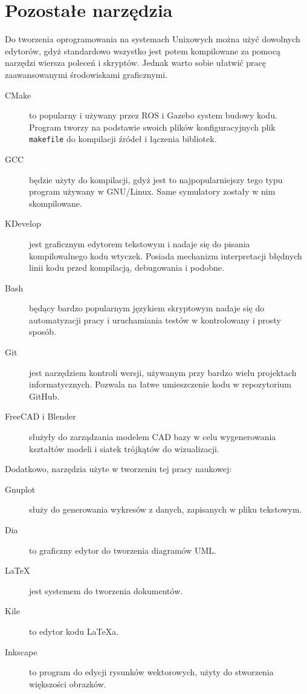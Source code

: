 \section{Pozostałe narzędzia}
	Do tworzenia oprogramowania na systemach Unixowych można użyć dowolnych edytorów, gdyż standardowo wszystko jest potem kompilowane za pomocą narzędzi wiersza poleceń i skryptów.
	Jednak warto sobie ułatwić pracę zaawansowanymi środowiskami graficznymi.
	\begin{description}
	\item[CMake] to popularny i używany przez ROS i Gazebo system budowy kodu. Program tworzy na podstawie swoich plików konfiguracyjnych plik \texttt{makefile} do kompilacji źródeł i łączenia bibliotek.
	\item[GCC] będzie użyty do kompilacji, gdyż jest to najpopularniejszy tego typu program używany w GNU/Linux. Same symulatory zostały w nim skompilowane.
	\item[KDevelop] jest graficznym edytorem tekstowym i nadaje się do pisania kompilowalnego kodu wtyczek.
	Posiada mechanizm interpretacji błędnych linii kodu przed kompilacją, debugowania i podobne.
	\item[Bash] będący bardzo popularnym językiem skryptowym nadaje się do automatyzacji pracy i uruchamiania testów w kontrolowany i prosty sposób.
	\item[Git] jest narzędziem kontroli wersji, używanym przy bardzo wielu projektach informatycznych. Pozwala na łatwe umieszczenie kodu w repozytorium GitHub.
	\item[FreeCAD i Blender] służyły do zarządzania modelem CAD bazy w celu wygenerowania kształtów modeli i siatek trójkątów do wizualizacji.
	\end{description}
	Dodatkowo, narzędzia użyte w tworzeniu tej pracy naukowej:
	\begin{description}
	\item[Gnuplot] służy do generowania wykresów z danych, zapisanych w pliku tekstowym.
	\item[Dia] to graficzny edytor do tworzenia diagramów UML.
	\item[\LaTeX] jest systemem do tworzenia dokumentów.
	\item[Kile] to edytor kodu \LaTeX a.
	\item[Inkscape] to program do edycji rysunków wektorowych, użyty do stworzenia większości obrazków.
	\end{description}


